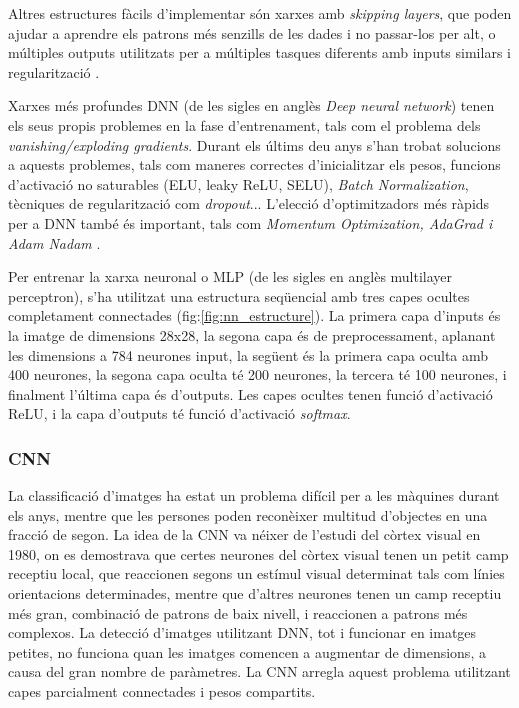 \documentclass[12pt, spanish]{article}
\begin{document}
Altres estructures fàcils d'implementar són xarxes amb \textit{skipping layers}, que poden ajudar a aprendre els patrons més senzills de les dades i no passar-los per alt, o múltiples outputs utilitzats per a múltiples tasques diferents amb inputs similars i regularització \cite[Cap. 10]{geron2019hands}.

Xarxes més profundes DNN (de les sigles en anglès \textit{Deep neural network}) tenen els seus propis problemes en la fase d'entrenament, tals com el problema dels \textit{vanishing/exploding gradients}. Durant els últims deu anys s'han trobat solucions a aquests problemes, tals com maneres correctes d'inicialitzar els pesos, funcions d'activació no saturables (ELU, leaky ReLU, SELU), \textit{Batch Normalization}, tècniques de regularització com \textit{dropout}... L'elecció d'optimitzadors més ràpids per a DNN també és important, tals com \textit{Momentum Optimization, AdaGrad i Adam Nadam} \cite[Cap. 11]{geron2019hands}.

Per entrenar la xarxa neuronal o MLP (de les sigles en anglès multilayer perceptron), s'ha utilitzat una estructura seqüencial amb tres capes ocultes completament connectades (fig:\ref{fig:nn_estructure}). La primera capa d'inputs és la imatge de dimensions 28x28, la segona capa és de preprocessament, aplanant les dimensions a 784 neurones input, la següent és la primera capa oculta amb 400 neurones, la segona capa oculta té 200 neurones, la tercera té 100 neurones, i finalment l'última capa és d'outputs. Les capes ocultes tenen funció d'activació ReLU, i la capa d'outputs té funció d'activació \textit{softmax}. 




\subsubsection{CNN}

La classificació d'imatges ha estat un problema difícil per a les màquines durant els anys, mentre que les persones poden reconèixer multitud d'objectes en una fracció de segon. La idea de la CNN va néixer de l'estudi del còrtex visual en 1980, on es demostrava que certes neurones del còrtex visual tenen un petit camp receptiu local, que reaccionen segons un estímul visual determinat tals com línies orientacions determinades, mentre que d'altres neurones tenen un camp receptiu més gran, combinació de patrons de baix nivell, i reaccionen a patrons més complexos. La detecció d'imatges utilitzant DNN, tot i funcionar en imatges petites, no funciona quan les imatges comencen a augmentar de dimensions, a causa del gran nombre de paràmetres. La CNN arregla aquest problema utilitzant capes parcialment connectades i pesos compartits. 
\end{document}

